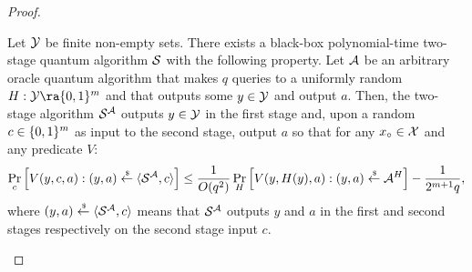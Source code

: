 \begin{proof}

\begin{lemma}\label{lem:FS}
Let $\mathcal{Y}$ be finite non-empty sets. There exists a black-box polynomial-time two-stage quantum algorithm $\mathcal{S}$ with the following property. Let $\mathcal{A}$ be an arbitrary oracle quantum algorithm that makes $q$ queries to a uniformly random $H:\calY\ra \bit^{m}$ and that outputs some $y\in \mathcal{Y}$ and output $a$. 
Then, the two-stage algorithm $\mathcal{S}^{\mathcal{A}}$ outputs $y\in\mathcal{Y}$ in the first stage
and, upon a random $c\in \{0,1\}^{m}$ as input to the second stage, output $a$ so that for any $x_\circ\in \mathcal{X}$ and any predicate $V$:
\begin{align*}
    \Pr_{c}\left[V(y,c,a):(y,a)\overset{\hspace{0.1em}\mathsf{\scriptscriptstyle\$}}{\leftarrow} \langle\mathcal{S}^{\mathcal{A}},c \rangle \right]\leq \frac{1}{O(q^2)}\Pr_{H}\left[V(y,H(y),a):(y,a)\overset{\hspace{0.1em}\mathsf{\scriptscriptstyle\$}}{\leftarrow} \mathcal{A}^H\right]-\frac{1}{2^{m+1}q},
\end{align*}
where 
$(y,a)\overset{\hspace{0.1em}\mathsf{\scriptscriptstyle\$}}{\leftarrow} \langle\mathcal{S}^{\mathcal{A}},c \rangle$ means that $\mathcal{S}^{\mathcal{A}}$ outputs $y$ and $a$ in the first and second stages respectively on the second stage input $c$.
\end{lemma}


\end{proof}
